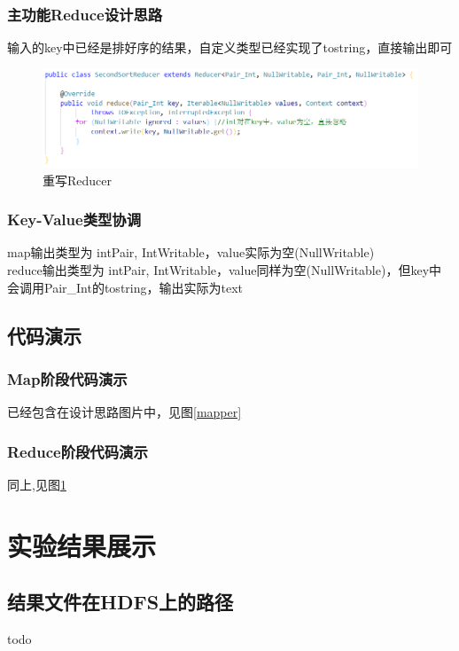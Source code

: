 \documentclass[a4paper,UTF8]{article}
\numberwithin{equation}{section}
\begin{document}
\subsubsection{主功能Reduce设计思路}
输入的key中已经是排好序的结果，自定义类型已经实现了tostring，直接输出即可
\begin{figure}[H]
    \centering

    \includegraphics[width = 15cm]{reduce1.png}

    \caption{重写Reducer}
    \label{reducer}
\end{figure}

\subsubsection{Key-Value类型协调}
map输出类型为 intPair, IntWritable，value实际为空(NullWritable) \\
reduce输出类型为 intPair, IntWritable，value同样为空(NullWritable)，但key中会调用Pair\_Int的tostring，输出实际为text
\subsection{代码演示}
\subsubsection{Map阶段代码演示}
已经包含在设计思路图片中，见图\ref{mapper}

\subsubsection{Reduce阶段代码演示}
同上,见图\ref{reducer}
\section{实验结果展示}

\subsection{结果文件在HDFS上的路径}
todo
\end{document}
